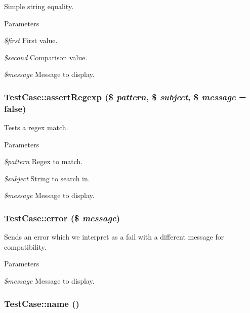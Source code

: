 \label{class_test_case_a1069303e24b7cef670a045e017c7465c}
Simple string equality. 
\begin{DoxyParams}{Parameters}
\item[{\em \$first}]First value. \item[{\em \$second}]Comparison value. \item[{\em \$message}]Message to display. \end{DoxyParams}
\hypertarget{class_test_case_a342e763f086479a4dfd80d719145dffd}{
\subsubsection[{assertRegexp}]{\setlength{\rightskip}{0pt plus 5cm}TestCase::assertRegexp (\$ {\em pattern}, \/  \$ {\em subject}, \/  \$ {\em message} = {\ttfamily false})}}
\label{class_test_case_a342e763f086479a4dfd80d719145dffd}
Tests a regex match. 
\begin{DoxyParams}{Parameters}
\item[{\em \$pattern}]Regex to match. \item[{\em \$subject}]String to search in. \item[{\em \$message}]Message to display. \end{DoxyParams}
\hypertarget{class_test_case_ac90136f48031a65db56fce777773129c}{
\subsubsection[{error}]{\setlength{\rightskip}{0pt plus 5cm}TestCase::error (\$ {\em message})}}
\label{class_test_case_ac90136f48031a65db56fce777773129c}
Sends an error which we interpret as a fail with a different message for compatibility. 
\begin{DoxyParams}{Parameters}
\item[{\em \$message}]Message to display. \end{DoxyParams}
\hypertarget{class_test_case_a0e29a22bb0eb113598d328e2acf64c62}{
\subsubsection[{name}]{\setlength{\rightskip}{0pt plus 5cm}TestCase::name ()}}
\label{class_test_case_a0e29a22bb0eb113598d328e2acf64c62}
